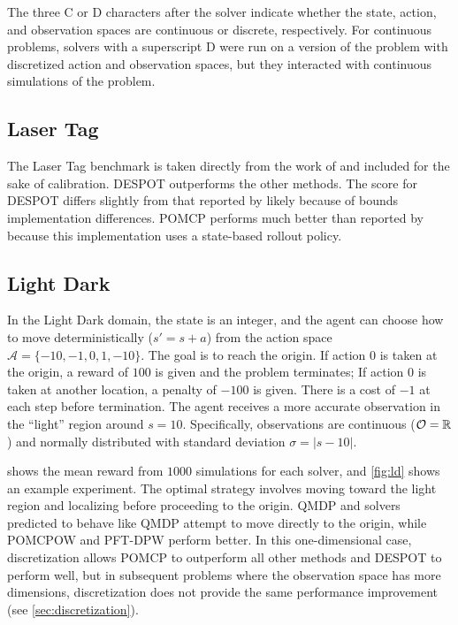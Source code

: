 \begin{table}
{    }
    \vspace{1mm}
    \footnotesize{The three C or D characters after the solver indicate whether the state, action, and observation spaces are continuous or discrete, respectively. For continuous problems, solvers with a superscript D were run on a version of the problem with discretized action and observation spaces, but they interacted with continuous simulations of the problem.}
\end{table}

\subsection{Laser Tag}

The Laser Tag benchmark is taken directly from the work of \citet{somani2013despot} and included for the sake of calibration. DESPOT outperforms the other methods. The score for DESPOT differs slightly from that reported by \citet{somani2013despot} likely because of bounds implementation differences.
POMCP performs much better than reported by \citet{somani2013despot} because this implementation uses a state-based rollout policy.

\subsection{Light Dark}

In the Light Dark domain, the state is an integer, and the agent can choose how to move deterministically ($s' = s+a$) from the action space $\mathcal{A}=\{-10, -1, 0, 1, -10\}$. 
The goal is to reach the origin.
If action $0$ is taken at the origin, a reward of $100$ is given and the problem terminates; If action $0$ is taken at another location, a penalty of $-100$ is given.
There is a cost of $-1$ at each step before termination.
The agent receives a more accurate observation in the ``light'' region around $s=10$.
Specifically, observations are continuous ($\mathcal{O}=\mathbb{R}$) and normally distributed with standard deviation $\sigma=|s-10|$.

 shows the mean reward from $1000$ simulations for each solver, and \cref{fig:ld} shows an example experiment.
The optimal strategy involves moving toward the light region and localizing before proceeding to the origin. 
QMDP and solvers predicted to behave like QMDP attempt to move directly to the origin, while POMCPOW and PFT-DPW perform better.
In this one-dimensional case, discretization allows POMCP to outperform all other methods and DESPOT to perform well, but in subsequent problems where the observation space has more dimensions, discretization does not provide the same performance improvement (see \cref{sec:discretization}).

